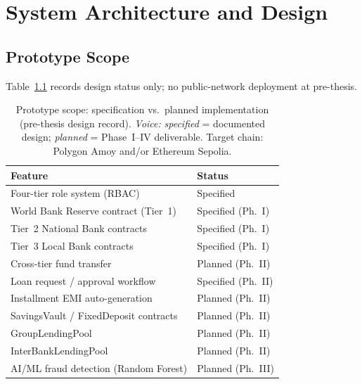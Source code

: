 \documentclass[12pt,a4paper]{report}
\newcommand{\tmarkPartial}{\faHourglassHalf}
\newcommand{\tmarkPlanned}{\textcolor{black!55}{\faCircle}}
\newcommand{\tableheadcolor}{\rowcolor{TableHeadBg}}
\newcommand{\tableheadfont}{\bfseries}
\begin{document}
\chapter{System Architecture and Design}

\section{Prototype Scope}
\label{sec:prototype-scope}

Table~\ref{tab:prototype-scope} records design status only; no public-network deployment at pre-thesis.

\begingroup
\footnotesize
\setlength{\tabcolsep}{3.5pt}
\renewcommand{\arraystretch}{0.88}
\begin{table}[H]
\centering
\caption[Prototype scope and implementation status]{Prototype scope: specification vs.\ planned implementation (pre-thesis design record). \textit{Voice:} \textit{specified} = documented design; \textit{planned} = Phase~I--IV deliverable. Target chain: Polygon Amoy and/or Ethereum Sepolia.}
\label{tab:prototype-scope}
\begin{tabular}{@{}p{7.4cm}p{5.4cm}@{}}
\toprule
\tableheadcolor
\tableheadfont Feature & \tableheadfont Status \\
\midrule
Four-tier role system (RBAC) & \tmarkPartial{} Specified \\
\rowcolor{RowShade}
World Bank Reserve contract (Tier~1) & \tmarkPartial{} Specified (Ph.~I) \\
Tier~2 National Bank contracts & \tmarkPartial{} Specified (Ph.~I) \\
\rowcolor{RowShade}
Tier~3 Local Bank contracts & \tmarkPartial{} Specified (Ph.~I) \\
Cross-tier fund transfer & \tmarkPlanned{} Planned (Ph.~II) \\
\rowcolor{RowShade}
Loan request / approval workflow & \tmarkPartial{} Specified (Ph.~II) \\
Installment EMI auto-generation & \tmarkPlanned{} Planned (Ph.~II) \\
\rowcolor{RowShade}
SavingsVault / FixedDeposit contracts & \tmarkPlanned{} Planned (Ph.~II) \\
GroupLendingPool & \tmarkPlanned{} Planned (Ph.~II) \\
\rowcolor{RowShade}
InterBankLendingPool & \tmarkPlanned{} Planned (Ph.~II) \\
AI/ML fraud detection (Random Forest) & \tmarkPlanned{} Planned (Ph.~III) \\

\end{tabular}
\end{table}
\end{document}
